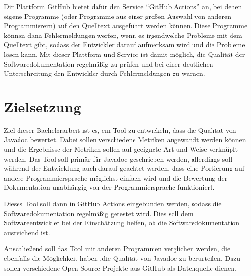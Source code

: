 Dir Plattform GitHub bietet dafür den Service \enquote{GitHub Actions} \cite{GithubActions} an, bei denen eigene Programme (oder Programme aus einer großen Auswahl von anderen Programmierern) auf den Quelltext ausgeführt werden können. Diese Programme können dann Fehlermeldungen werfen, wenn es irgendwelche Probleme mit dem Quelltext gibt, sodass der Entwickler darauf aufmerksam wird und die Probleme lösen kann. Mit dieser Plattform und Service ist damit möglich, die Qualität der Softwaredokumentation regelmäßig zu prüfen und bei einer deutlichen Unterschreitung den Entwickler durch Fehlermeldungen zu warnen. 


\section{Zielsetzung}
Ziel dieser Bachelorarbeit ist es, ein Tool zu entwickeln, dass die Qualität von Javadoc bewertet. Dabei sollen verschiedene Metriken angewandt werden können und die Ergebnisse der Metriken sollen auf geeignete Art und Weise verknüpft werden. Das Tool soll primär für Javadoc geschrieben werden, allerdings soll während der Entwicklung auch darauf geachtet werden, dass eine Portierung auf andere Programmiersprache möglichst einfach wird und die Bewertung der Dokumentation unabhängig von der Programmiersprache funktioniert. 

Dieses Tool soll dann in GitHub Actions eingebunden werden, sodass die Softwaredokumentation regelmäßig getestet wird.  Dies soll dem Softwareentwickler bei der Einschätzung helfen, ob die Softwaredokumentation ausreichend ist. 

Anschließend soll das Tool mit anderen Programmen verglichen werden, die ebenfalls die Möglichkeit haben ,die Qualität von Javadoc zu berurteilen. Dazu sollen verschiedene Open-Source-Projekte aus GitHub als Datenquelle dienen. 


